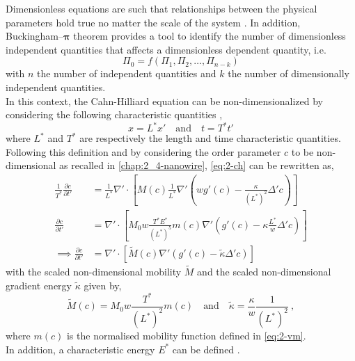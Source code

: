 Dimensionless equations are such that relationships between the physical parameters hold true no matter the scale of the system \cite{Sonin}. In addition, Buckingham--$\mathbf{\pi}$ theorem provides a tool to identify the number of dimensionless independent quantities that affects a dimensionless dependent quantity, i.e.
\begin{equation}
    \Pi_0 = f(\Pi_1, \Pi_2, \ldots, \Pi_{n-k})
\end{equation}
with $n$ the number of independent quantities and $k$ the number of dimensionally independent quantities.\\
In this context, the Cahn-Hilliard equation can be non-dimensionalized by considering the following characteristic quantities \cite{MaoDemkowicz2021,Sonin},
\begin{equation}
    x = L^* x'  \quad\text{and}\quad t = T^* t'  %
\end{equation}
where $L^*$ and $T^*$ are respectively the length and time characteristic quantities.\\
Following this definition and by considering the order parameter $c$ to be non-dimensional as recalled in \autoref{chap:2_4-nanowire}, \autoref{eq:2-ch} can be rewritten as,
\begin{equation}
    \begin{aligned}
        \frac{1}{T^*} \frac{\partial c}{\partial t'} &= \frac{1}{L^*} \nabla' \cdot \left[ M(c) \frac{1}{L^*} \nabla'\left(w g'(c) - \frac{\kappa}{(L^*)^2} \Delta' c \right)\right]\\
        \frac{\partial c}{\partial t'} &= \nabla' \cdot \left[ M_0 w \frac{T^* E^*}{(L^*)^5} m(c) \nabla' \left( g'(c) - \kappa \frac{L^*}{w} \Delta' c\right)\right]\\
        \implies \frac{\partial c}{\partial t'} &= \nabla' \cdot \left[ \tilde{M}(c) \nabla' \left(g'(c) - \tilde{\kappa} \Delta' c\right)\right]
    \end{aligned}
\end{equation}
with the scaled non-dimensional mobility $\tilde{M}$ and the scaled non-dimensional gradient energy $\tilde{\kappa}$ given by,
\begin{equation}
    \tilde{M}(c) = M_0 w \frac{T^*}{(L^*)^2} m(c) \quad\text{and}\quad \tilde{\kappa} = \frac{\kappa}{w} \frac{1}{(L^*)^2}\ ,
\end{equation}
where $m(c)$ is the normalised mobility function defined in \autoref{eq:2-vm}.\\
In addition, a characteristic energy $E^*$ can be defined \cite{MaoDemkowicz2021}.
